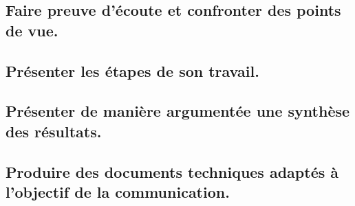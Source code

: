 \documentclass[10pt,fleqn]{article}
\begin{document}
\subsection{Faire preuve d’écoute et confronter des points de vue.} 

\begin{multicols}{2} 

\end{multicols}

\subsection{Présenter les étapes de son travail.} 

\begin{multicols}{2} 

\end{multicols}

\subsection{Présenter de manière argumentée une synthèse des résultats.} 

\begin{multicols}{2} 

\end{multicols}

\subsection{Produire des documents techniques adaptés à l'objectif de la communication. } 
\end{document}
